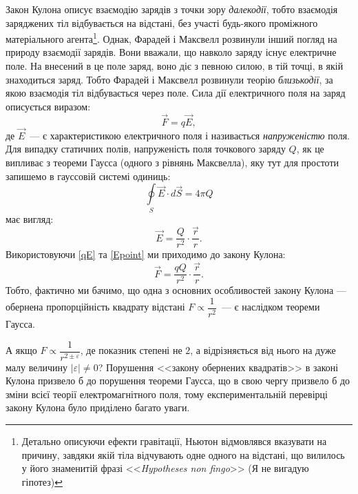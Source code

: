 Закон Кулона описує взаємодію зарядів з точки зору \emph{далекодії}, тобто взаємодія заряджених тіл відбувається на відстані, без участі будь-якого проміжного матеріального агента\footnote{Детально описуючи ефекти гравітації, Ньютон відмовлявся вказувати на причину, завдяки якій тіла відчувають одне одного на відстані, що вилилось у його знаменитій фразі <<\emph{Hypotheses non fingo}>> (Я не вигадую гіпотез)}. Однак, Фарадей і Максвелл розвинули інший погляд на природу взаємодії зарядів. Вони вважали, що навколо заряду існує електричне поле. На внесений в це поле заряд, воно діє з певною силою, в  тій точці, в якій знаходиться заряд. Тобто Фарадей і Максвелл розвинули теорію \emph{близькодії}, за якою взаємодія тіл відбувається через поле.  Сила дії електричного поля на заряд описується виразом:
\begin{equation}\label{qE}
    \vec{F} = q\vec{E},
\end{equation}
де $\vec{E}$~--- є характеристикою електричного поля і називається \emph{напруженістю} поля. Для випадку статичних полів, напруженість поля точкового заряду $Q$, як це випливає з теореми Гаусса (одного з рівнянь Максвелла), яку тут для простоти запишемо в гауссовій системі одиниць:
\begin{equation}\label{Gauss}
    \oint\limits_S \vec{E}\cdot d\vec{S} = 4\pi Q
\end{equation}
має вигляд:
\begin{equation}\label{Epoint}
    \vec{E} = \frac{Q}{r^2}\cdot\frac{\vec{r}}{r}.
\end{equation}
Використовуючи \eqref{qE} та \eqref{Epoint} ми приходимо до закону Кулона:
\begin{equation*}\label{}
    \vec{F} = \frac{qQ}{r^2}\cdot\frac{\vec{r}}{r}.
\end{equation*}
Тобто, фактично ми бачимо, що одна з основних особливостей закону Кулона --- обернена пропорційність квадрату відстані $F \propto \dfrac1{r^2}$~--- є наслідком теореми Гаусса.

А якщо $F \propto \dfrac1{r^{2 \pm \varepsilon}}$, де  показник степені не $2$, а відрізняється від нього на дуже малу величину $|\varepsilon| \neq 0$? Порушення <<закону обернених квадратів>> в законі Кулона призвело б до порушення теореми Гаусса, що в свою чергу призвело б до зміни всієї теорії електромагнітного поля, тому експериментальній перевірці закону Кулона було приділено багато уваги.




